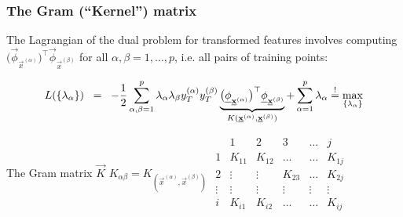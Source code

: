 \begin{frame}\frametitle{The Gram (``Kernel'') matrix}

The Lagrangian of the dual problem for transformed features involves computing $\big( \vec \phi_{\vec{x}^{(\alpha)}} \big)^\top 
            \vec \phi_{\vec{x}^{(\beta)}}$ for all $\alpha,\beta=1,\ldots,p$, i.e. all pairs of training points:

\begin{equation} 
    L(\{\lambda_\alpha\})
        \;\;=\;\;  -\frac{1}{2} \sum\limits_{\alpha, \beta = 1}^p 
        \lambda_\alpha \lambda_\beta y_T^{(\alpha)}
        y_T^{(\beta)} 
        \underbrace{\big( \underline{\mathbf{\phi}}_{\underline{\mathbf{x}}^{(\alpha)}} \big)^\top 
            \underline{\mathbf{\phi}}_{\underline{\mathbf{x}}^{(\beta)}}}_{ K(\underline{\mathbf{x}}^{(\alpha)}, \underline{\mathbf{x}}^{(\beta)})  }
        + \sum\limits_{\alpha = 1}^p \lambda_\alpha{}
        \stackrel{\mathrm{!}}{=} \max_{\{\lambda_\alpha\}}
\end{equation}


\begin{block}{The Gram matrix $\vec K$} 
		$K_{\alpha\beta} = K_{(\vec{x}^{(\alpha)}, \vec{x}^{(\beta)})}$
		\hspace{1cm}
		$\begin{array}{c|ccccc}
		  & 1      & 2      & 3      & \ldots & j      \\
		  \hline
		  1	& K_{11} & K_{12} & \ldots & \ldots & K_{1j} \\
		  2 	& \vdots & \vdots & K_{23} & \ldots & K_{2j} \\
		  \vdots 	& \vdots & \vdots & \vdots & \vdots & \vdots \\
		  i	& K_{i1} & K_{i2} & \ldots & \ldots & K_{ij}
		\end{array}
		$
	\end{block}
	


\pause


\end{frame}

